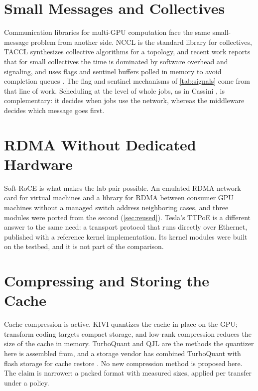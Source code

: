 \section{Small Messages and Collectives}

Communication libraries for multi-GPU computation face the same small-message
problem from another side. NCCL \citep{nccl} is the standard library for
collectives, TACCL \citep{shah2023taccl} synthesizes collective algorithms for
a topology, and recent work reports that for small collectives the time is
dominated by software overhead and signaling, and uses flags and sentinel
buffers polled in memory to avoid completion queues \citep{shen2026sol}. The
flag and sentinel mechanisms of \cref{tab:signals} come from that line of
work. Scheduling at the level of whole jobs, as in Cassini
\citep{rajasekaran2024cassini}, is complementary: it decides when jobs use
the network, whereas the middleware decides which message goes first.

\section{RDMA Without Dedicated Hardware}

Soft-RoCE \citep{ibta_softroce2015} is what makes the lab pair possible. An
emulated RDMA network card for virtual machines \citep{rocm_ernic} and a
library for RDMA between consumer GPU machines without a managed switch
\citep{libmesh} address neighboring cases, and three modules were ported
from the second (\cref{sec:reused}). Tesla's TTPoE \citep{ttpoe} is a
different answer to the same need: a transport protocol that runs directly
over Ethernet, published with a reference kernel implementation. Its kernel
modules were built on the testbed, and it is not part of the comparison.

\section{Compressing and Storing the Cache}

Cache compression is active. KIVI \citep{liu2024kivi} quantizes the cache in
place on the GPU; transform coding \citep{staniszewski2026kvtc} targets compact storage, and
low-rank compression \citep{zhang2024lorc} reduces the size of the cache in
memory. TurboQuant
\citep{zandieh2025turboquant} and QJL \citep{zandieh2024qjl} are the methods
the quantizer here is assembled from, and a storage vendor has combined
TurboQuant with flash storage for cache restore
\citep{alvarez2026flashblade}. No new compression method is proposed here. The claim is narrower: a packed format with measured sizes, applied per
transfer under a policy.

